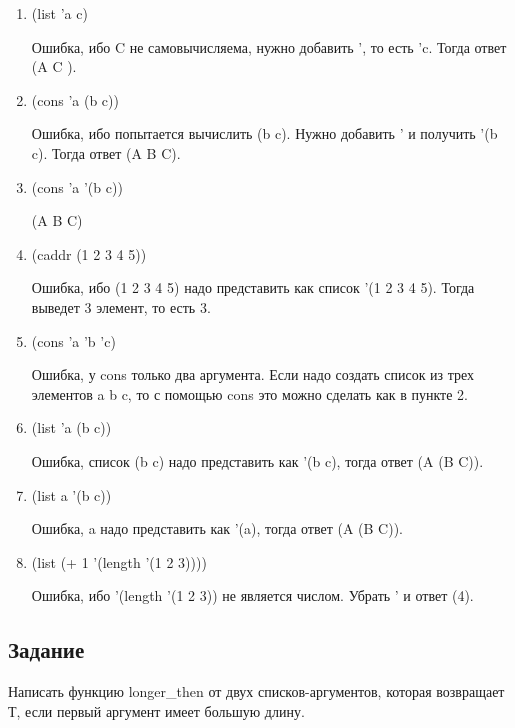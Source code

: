 \begin{enumerate}[label*=\arabic*.]
	\item (list 'a c)
	
	Ошибка, ибо C не самовычисляема, нужно добавить ', то есть 'c. Тогда ответ (A C ).
	
	\item  	(cons 'a (b c))
	
	Ошибка, ибо попытается вычислить (b c). Нужно добавить ' и получить '(b c). Тогда ответ (A B C).
	
	\item (cons 'a '(b c))
	
	(A B C)
	
	\item  (caddr (1 2 3 4 5))
	
	Ошибка, ибо (1 2 3 4 5) надо представить как список '(1 2 3 4 5). Тогда выведет 3 элемент, то есть 3. 
	
	\item (cons 'a 'b 'c)
	
	Ошибка, у cons только два аргумента. Если надо создать список из трех элементов a b c, то с помощью cons это можно сделать как в пункте 2.
	
	\item (list 'a (b c))
	
	Ошибка, список (b c) надо представить как '(b c), тогда ответ (A (B C)).
	
	\item (list a '(b c))
	
	Ошибка, a надо представить как '(a), тогда ответ (A (B C)).
		
	\item (list (+ 1 '(length '(1 2 3))))
	
	Ошибка,  ибо  '(length '(1 2 3)) не является числом. Убрать ' и ответ (4).

\end{enumerate}

\subsection{Задание }

Написать функцию longer\_then от двух списков-аргументов, которая возвращает Т, если первый аргумент имеет большую длину.


